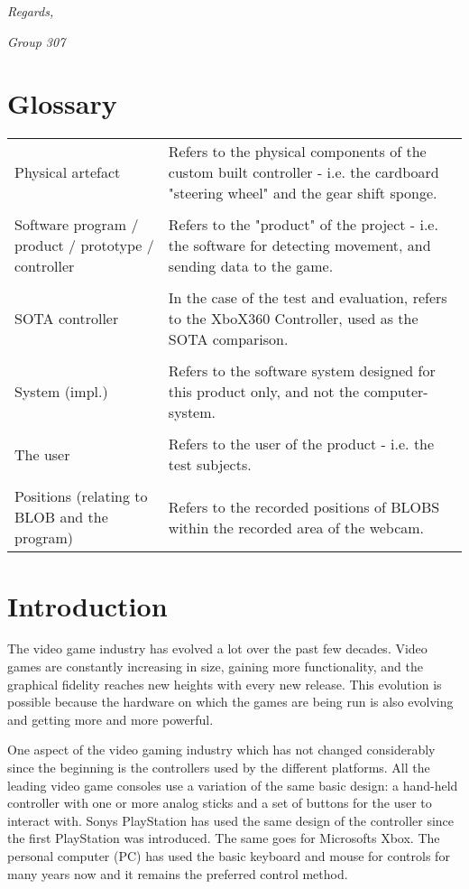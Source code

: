 \noindent\textit{Regards,}

\noindent\textit{Group 307}

\clearpage

\section{Glossary}
\begin{table}[!htbp]
\begin{tabular}{p{2in} p{3.4in}}
Physical artefact & Refers to the physical components of the custom built controller - i.e. the cardboard "steering wheel" and the gear shift sponge.\\
 & \\
Software program / product / prototype / controller & Refers to the "product" of the project - i.e. the software for detecting movement, and sending data to the game.\\
 & \\
SOTA controller & In the case of the test and evaluation, refers to the XboX360 Controller, used as the SOTA comparison.\\
 & \\
System (impl.) & Refers to the software system designed for this product only, and not the computer-system.\\
 & \\
The user & Refers to the user of the product - i.e. the test subjects.\\
 & \\
Positions (relating to BLOB and the program) & Refers to the recorded positions of BLOBS within the recorded area of the webcam.\\
\end{tabular}
\end{table}

\clearpage

\section{Introduction}
The video game industry has evolved a lot over the past few decades. Video games are constantly increasing in size, gaining more functionality, and the graphical fidelity reaches new heights with every new release. This evolution is possible because the hardware on which the games are being run is also evolving and getting more and more powerful.
\bigskip

One aspect of the video gaming industry which has not changed considerably since the beginning is the controllers used by the different platforms. All the leading video game consoles use a variation of the same basic design: a hand-held controller with one or more analog sticks and a set of buttons for the user to interact with. Sonys PlayStation has used the same design of the controller since the first PlayStation was introduced. The same goes for Microsofts Xbox. The personal computer (PC) has used the basic keyboard and mouse for controls for many years now and it remains the preferred control method.
\bigskip

